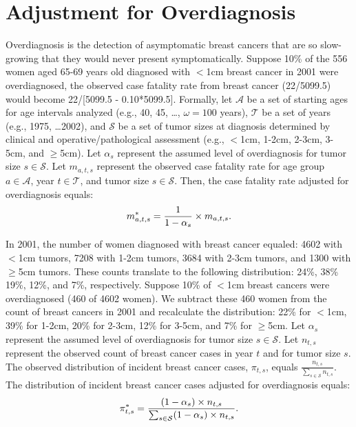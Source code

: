 \documentclass[11pt,letterpaper]{article}
\theoremstyle{plain}
\begin{document}
\section{Adjustment for Overdiagnosis}
Overdiagnosis is the detection of asymptomatic breast cancers that are
so slow-growing that they would never present
symptomatically.\cite{MarProMil2015} Suppose 10\% of the 556 women
aged 65-69 years old diagnosed with $<$1cm breast cancer in 2001 were
overdiagnosed, the observed case fatality rate from breast cancer
(22/5099.5) would become 22/[5099.5 - 0.10*5099.5].  Formally, let
$\mathcal{A}$ be a set of starting ages for age intervals analyzed
(e.g., 40, 45, \dots, $\omega=100$ years), $\mathcal{T}$ be a set of
years (e.g., 1975, \dots 2002), and $\mathcal{S}$ be a set of tumor
sizes at diagnosis determined by clinical and operative/pathological
assessment (e.g., $<$1cm, 1-2cm, 2-3cm, 3-5cm, and $\geq$5cm).  Let
$\alpha_s$ represent the assumed level of overdiagnosis for tumor size
$s\in\mathcal{S}$.  Let $m_{a,t,s}$ represent the observed case
fatality rate for age group $a \in \mathcal{A}$, year
$t \in \mathcal{T}$, and tumor size $s \in \mathcal{S}$.  Then, the
case fatality rate adjusted for overdiagnosis equals:
\begin{eqnarray}
m^*_{a,t,s}=\frac{1}{1-\alpha_s} \times m_{a,t,s}. \notag
\end{eqnarray}

In 2001, the number of women diagnosed with breast cancer equaled:
4602 with $<$1cm tumors, 7208 with 1-2cm tumors, 3684 with 2-3cm
tumors, and 1300 with $\geq$5cm tumors.  These counts translate to the
following distribution: 24\%, 38\% 19\%, 12\%, and 7\%, respectively.
Suppose 10\% of $<$1cm breast cancers were overdiagnosed (460 of 4602
women).  We subtract these 460 women from the count of breast cancers
in 2001 and recalculate the distribution: 22\% for $<$1cm, 39\% for
1-2cm, 20\% for 2-3cm, 12\% for 3-5cm, and 7\% for $\geq$5cm.  
Let $\alpha_s$ represent the assumed level of overdiagnosis for tumor
size $s\in\mathcal{S}$.  Let $n_{t,s}$ represent the observed count
of breast cancer cases in year $t$ and for tumor size $s$.  The
observed distribution of incident breast cancer cases, $\pi_{t,s}$, equals
$\frac{n_{t,s}}{\sum_{s\in\mathcal{S}}n_{t,s}}$.  The distribution of
incident breast cancer cases adjusted for overdiagnosis equals: 
\begin{eqnarray}
\pi^*_{t,s}=\frac{(1-\alpha_s) \times n_{t,s}}{\sum_{s\in\mathcal{S}}
  (1-\alpha_s) \times n_{t,s}} \notag.
\end{eqnarray} 
\end{document}

